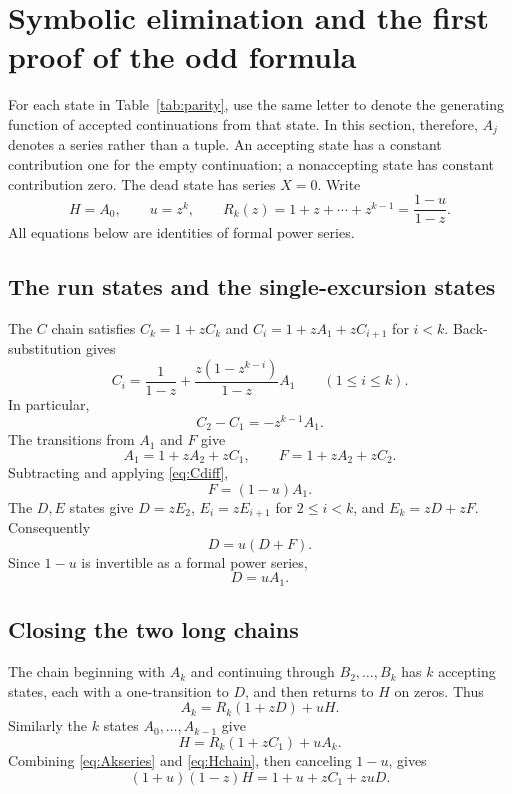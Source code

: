 \documentclass[11pt,letterpaper]{article}
\numberwithin{equation}{section}
\theoremstyle{definition}
\theoremstyle{remark}
\begin{document}
\section{Symbolic elimination and the first proof of the odd formula}
\label{sec:eliminate}

For each state in Table~\ref{tab:parity}, use the same letter to denote the
generating function of accepted continuations from that state. In this
section, therefore, $A_j$ denotes a series rather than a tuple. An accepting
state has a constant contribution one for the empty continuation; a
nonaccepting state has constant contribution zero. The dead state has
series $X=0$. Write
\[
 H=A_0,\qquad u=z^k,\qquad R_k(z)=1+z+\cdots+z^{k-1}=\frac{1-u}{1-z}.
\]
All equations below are identities of formal power series.

\subsection{The run states and the single-excursion states}

The $C$ chain satisfies $C_k=1+zC_k$ and
$C_i=1+zA_1+zC_{i+1}$ for $i<k$. Back-substitution gives
\begin{equation}
 C_i=\frac1{1-z}
       +\frac{z(1-z^{k-i})}{1-z}A_1
 \qquad(1\le i\le k).
 \label{eq:Cseries}
\end{equation}
In particular,
\begin{equation}
 C_2-C_1=-z^{k-1}A_1.
 \label{eq:Cdiff}
\end{equation}
The transitions from $A_1$ and $F$ give
\[
 A_1=1+zA_2+zC_1,\qquad F=1+zA_2+zC_2.
\]
Subtracting and applying \eqref{eq:Cdiff},
\begin{equation}
 F=(1-u)A_1.
 \label{eq:Fseries}
\end{equation}
The $D,E$ states give $D=zE_2$, $E_i=zE_{i+1}$ for $2\le i<k$, and
$E_k=zD+zF$. Consequently
\[
 D=u(D+F).
\]
Since $1-u$ is invertible as a formal power series,
\begin{equation}
 D=uA_1.
 \label{eq:Dseries}
\end{equation}

\subsection{Closing the two long chains}

The chain beginning with $A_k$ and continuing through
$B_2,\ldots,B_k$ has $k$ accepting states, each with a one-transition to
$D$, and then returns to $H$ on zeros. Thus
\begin{equation}
 A_k=R_k(1+zD)+uH.
 \label{eq:Akseries}
\end{equation}
Similarly the $k$ states $A_0,\ldots,A_{k-1}$ give
\begin{equation}
 H=R_k(1+zC_1)+uA_k.
 \label{eq:Hchain}
\end{equation}
Combining \eqref{eq:Akseries} and \eqref{eq:Hchain}, then canceling
$1-u$, gives
\begin{equation}
 (1+u)(1-z)H=1+u+zC_1+zuD.
 \label{eq:combined}
\end{equation}
\end{document}
